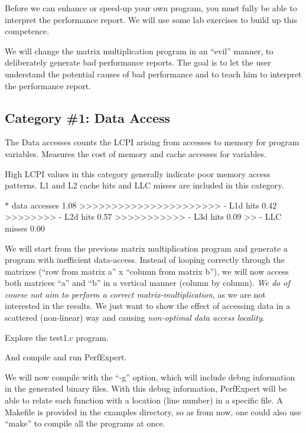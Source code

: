 Before we can enhance or speed-up your own program, you must fully be able to interpret the performance report. We will use some lab exercises to build up this competence.

We will change the matrix multiplication program in an ``evil'' manner, to deliberately generate bad performance reports. The goal is to let the user understand the potential causes of bad performance and to teach him to interpret the performance report.

\subsection{Category \#1: Data Access}
\label{subsec:CAT1_Data_Access}

The Data accesses counts the LCPI arising from accesses to memory for program variables. Measures the cost of memory and cache accesses for variables.

High LCPI values in this category generally indicate poor memory access patterns. L1 and L2 cache hits and LLC misses are included in this category.

\begin{prompt}
* data accesses          1.08 >>>>>>>>>>>>>>>>>>>>>>
  - L1d hits             0.42 >>>>>>>>
  - L2d hits             0.57 >>>>>>>>>>>
  - L3d hits             0.09 >>
  - LLC misses           0.00
\end{prompt}

We will start from the previous matrix multiplication program and generate a program with inefficient data-access. Instead of looping correctly through the matrixes (``row from matrix a'' x ``column from matrix b''), we will now access both matrices ``a'' and ``b'' in a vertical manner (column by column). \emph{We do of course not aim to perform a correct matrix-multiplication}, as we are not interested in the results. We just want to show the effect of accessing data in a scattered (non-linear) way and causing \emph{non-optimal data access locality}.

Explore the test1.c program.

\begin{prompt}
\end{prompt}

And compile and run PerfExpert.

We will now compile with the ``-g'' option, which will include debug information in the generated binary files. With this debug information, PerfExpert will be able to relate each function with a location (line number) in a specific file. A Makefile is provided in the examples directory, so as from now, one could also use ``make'' to compile all the programs at once.

